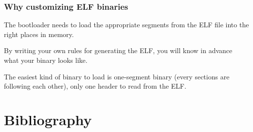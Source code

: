 
\begin{frame}
  \frametitle{Why customizing ELF binaries}

  The bootloader needs to load the appropriate segments from the ELF
  file into the right places in memory.

  \-

  By writing your own rules for generating the ELF, you will know in
  advance what your binary looks like.

  \-

  The easiest kind of binary to load is one-segment binary (every
  sections are following each other), only one header to read from the
  ELF.

\end{frame}

%
%
%

%
%

\section{Bibliography}

\begin{thebibliography}{4}


\end{thebibliography}


